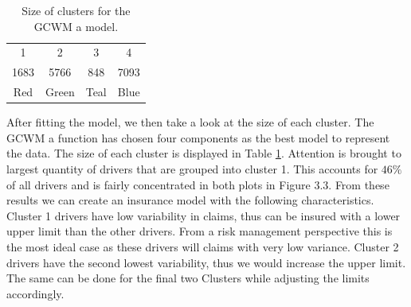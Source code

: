 \documentclass[11pt,letterpaper]{article}
\numberwithin{equation}{section}
\numberwithin{equation}{section}
\numberwithin{equation}{section}
\begin{document}
\begin{table}[!htb]
\centering
\caption{Size of clusters for the GCWM a model.}
\label{table:sizeSev}
\begin{tabular}{cccc}
\hline\hline 
1   & 2  &  3   & 4    \\
1683 & 5766 & 848 & 7093 \\
Red & Green & Teal & Blue \\
\hline\hline
\end{tabular}
\end{table}

After fitting the model, we then take a look at the size of each cluster. The GCWM a function has chosen four components as the best model to represent the data. The size of each cluster is displayed in Table \ref{table:sizeSev}. Attention is brought to largest quantity  of drivers that are grouped into cluster 1. This accounts for $ 46 \% $ of all drivers and is fairly concentrated in both plots in Figure 3.3.
From these results we can create an insurance model with the following characteristics. Cluster 1 drivers have low variability in claims, thus can be insured with a lower upper limit than the other drivers. From a risk management perspective this is the most ideal case as these drivers will claims with very  low variance. Cluster 2 drivers have the second lowest variability, thus we would increase the upper limit. The same can be done for the final two Clusters while adjusting  the limits accordingly.
\begin{table}[!htb]
\centering
\caption{Summarized volatility information of each cluster.}
\label{table:volSev}
\end{table}
\end{document}
